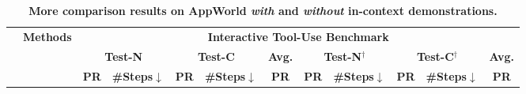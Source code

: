 \begin{table}[t]
    \footnotesize
    \centering
    \setlength{\tabcolsep}{5pt}
    \caption{\textbf{More comparison results on AppWorld \textit{with} and \textit{without} in-context demonstrations.}}
    \label{tab:more_exp_appworld}

    \begin{tabular}{>{\centering\arraybackslash}m{0.5cm} l cc cc c | cc cc c}
        \toprule
        \multirow{3}{*}{\textbf{Model}} &
        \multirow{3}{*}{\textbf{Methods}} &
        \multicolumn{10}{c}{\textbf{Interactive Tool-Use Benchmark}} \\
        \cmidrule(lr){3-7} \cmidrule(lr){8-12}
        & &
        \multicolumn{2}{c}{\textbf{Test-N}} &
        \multicolumn{2}{c}{\textbf{Test-C}} &
        \multicolumn{1}{c|}{\textbf{Avg.}} &
        \multicolumn{2}{c}{\textbf{Test-N$^\dagger$}} &
        \multicolumn{2}{c}{\textbf{Test-C$^\dagger$}} &
        \multicolumn{1}{c}{\textbf{Avg.}} \\
        \cmidrule(lr){3-4} \cmidrule(lr){5-6} \cmidrule(lr){7-7}
        \cmidrule(lr){8-9} \cmidrule(lr){10-11} \cmidrule(lr){12-12}
        & &
        \textbf{PR} & \textbf{\#Steps$\downarrow$} &
        \textbf{PR} & \textbf{\#Steps$\downarrow$} &
        \textbf{PR} &
        \textbf{PR} & \textbf{\#Steps$\downarrow$} &
        \textbf{PR} & \textbf{\#Steps$\downarrow$} &
        \textbf{PR} \\
        \midrule


\end{tabular}
\end{table}
